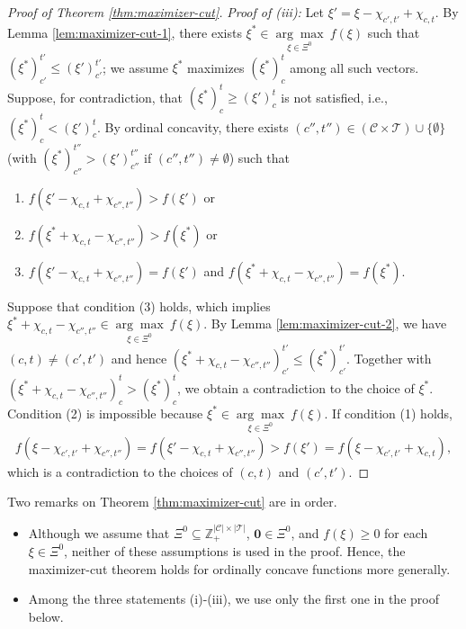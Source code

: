 \documentclass[12pt]{amsart}
\theoremstyle{remark}
\begin{document}
\begin{proof}[Proof of Theorem \ref{thm:maximizer-cut}]
\smallskip
\noindent
\emph{Proof of (iii):}  Let $\xi'=\xi-\chi_{c',t'}+\chi_{c,t}$. By Lemma \ref{lem:maximizer-cut-1}, there exists $\xi^*\in \underset {\xi\in \Xi^0} {\arg\max} \: f(\xi)$ such that $(\xi^*)_{c'}^{t'}\leq (\xi')_{c'}^{t'}$; we assume $\xi^*$ maximizes $(\xi^*)_{c}^{t}$ among all such vectors. Suppose, for contradiction, that $(\xi^*)_{c}^{t}\geq (\xi')_{c}^{t}$ is not satisfied, i.e., $(\xi^*)_{c}^{t}<(\xi')_{c}^{t}$. By ordinal concavity, there exists $(c'',t'')\in (\mathcal{C}\times \mathcal{T})\cup\{\emptyset\}$ (with $(\xi^*)_{c''}^{t''}>(\xi')_{c''}^{t''}$ if $(c'',t'')\neq \emptyset$) such that
\begin{enumerate}
\item $f(\xi'-\chi_{c,t}+\chi_{c'',t''})>f(\xi')$ or
\item $f(\xi^*+\chi_{c,t}-\chi_{c'',t''})>f(\xi^*)$ or
\item $f(\xi'-\chi_{c,t}+\chi_{c'',t''})=f(\xi')$ and $f(\xi^*+\chi_{c,t}-\chi_{c'',t''})=f(\xi^*)$.
\end{enumerate}
Suppose that condition (3) holds, which implies $\xi^*+\chi_{c,t}-\chi_{c'',t''}\in \underset {\xi\in \Xi^0} {\arg\max} \: f(\xi)$. By Lemma \ref{lem:maximizer-cut-2}, we have $(c,t)\neq (c',t')$ and hence $(\xi^*+\chi_{c,t}-\chi_{c'',t''})_{c'}^{t'}\leq (\xi^*)_{c'}^{t'}$. Together with $(\xi^*+\chi_{c,t}-\chi_{c'',t''})_c^t>(\xi^*)_c^t$, we obtain a  contradiction to the choice of $\xi^*$. Condition (2) is impossible because $\xi^*\in \underset {\xi\in \Xi^0} {\arg\max} \: f(\xi)$. If condition (1) holds,
\begin{align*}
f(\xi-\chi_{c',t'}+\chi_{c'',t''})=f(\xi'-\chi_{c,t}+\chi_{c'',t''})>f(\xi')=f(\xi-\chi_{c',t'}+\chi_{c,t}),
\end{align*}
which is a contradiction to the choices of $(c,t)$ and $(c',t')$.
\end{proof}
Two remarks on Theorem \ref{thm:maximizer-cut} are in order.
\begin{itemize}
\item Although we assume that $\Xi^0\subseteq \mathbb{Z}^{|\mathcal{C}|\times |\mathcal{T}|}_+$, $\mathbf{0}\in \Xi^0$, and $f(\xi)\geq 0$ for each
$\xi\in \Xi^0$, neither of these assumptions is used in the proof. Hence,
the maximizer-cut theorem holds for ordinally concave functions more generally.
\item Among the three statements (i)-(iii), we use only the first one in the proof below.
\end{itemize}
\end{document}
